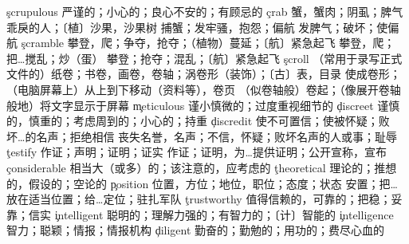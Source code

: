 \begin{multicols}{2}
\c{scrupulous}  \a 严谨的；小心的；良心不安的；有顾忌的
\c{crab}  \n 蟹，蟹肉；阴虱；脾气乖戾的人；〔植〕沙果，沙果树 \vi 捕蟹；发牢骚，抱怨；偏航 \vt 发脾气；破坏；使偏航
\c{scramble}  \vi 攀登，爬；争夺，抢夺；（植物）蔓延；〔航〕紧急起飞 \vt 攀登，爬；把…搅乱；炒（蛋） \n 攀登；抢夺；混乱；〔航〕紧急起飞
\c{scroll}  \n （常用于录写正式文件的）纸卷；书卷，画卷，卷轴；涡卷形（装饰）；〔古〕表，目录 \vt 使成卷形；（电脑屏幕上）从上到下移动（资料等），卷页 \vi （似卷轴般）卷起；（像展开卷轴般地）将文字显示于屏幕
\c{meticulous}  \a 谨小慎微的；过度重视细节的
\c{discreet}  \a 谨慎的，慎重的；考虑周到的；小心的；持重
\c{discredit}  \vt 使不可置信；使被怀疑；败坏…的名声；拒绝相信 \n 丧失名誉，名声；不信，怀疑；败坏名声的人或事；耻辱
\c{testify}  \vi 作证；声明；证明；证实 \vt 作证；证明，为…提供证明；公开宣称，宣布
\c{considerable}  \a 相当大（或多）的；该注意的，应考虑的
\c{theoretical}  \a 理论的；推想的，假设的；空论的
\c{position}  \n 位置，方位；地位，职位；态度；状态 \vt 安置；把…放在适当位置；给…定位；驻扎军队
\c{trustworthy}  \a 值得信赖的，可靠的；把稳；妥靠；信实
\c{intelligent}  \a 聪明的；理解力强的；有智力的；〔计〕智能的
\c{intelligence}  \n 智力；聪颖；情报；情报机构
\c{diligent}  \a 勤奋的；勤勉的；用功的；费尽心血的


\end{multicols}
